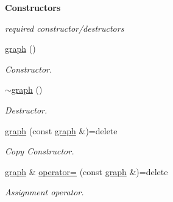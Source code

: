\begin{Indent}{\bf Constructors}\par
{\em required constructor/destructors }\begin{DoxyCompactItemize}
\item 
\hypertarget{classmystl_1_1graph_a3bd4b577259268bb5ddc09953d5bbdd4}{\hyperlink{classmystl_1_1graph_a3bd4b577259268bb5ddc09953d5bbdd4}{graph} ()}\label{classmystl_1_1graph_a3bd4b577259268bb5ddc09953d5bbdd4}

\begin{DoxyCompactList}\small\item\em Constructor. \end{DoxyCompactList}\item 
\hypertarget{classmystl_1_1graph_a18df46cc1311ba1999f0ce3cdf1ab21c}{\hyperlink{classmystl_1_1graph_a18df46cc1311ba1999f0ce3cdf1ab21c}{$\sim$graph} ()}\label{classmystl_1_1graph_a18df46cc1311ba1999f0ce3cdf1ab21c}

\begin{DoxyCompactList}\small\item\em Destructor. \end{DoxyCompactList}\item 
\hypertarget{classmystl_1_1graph_aaaec7844368eb2450398bd41c313a464}{\hyperlink{classmystl_1_1graph_aaaec7844368eb2450398bd41c313a464}{graph} (const \hyperlink{classmystl_1_1graph}{graph} \&)=delete}\label{classmystl_1_1graph_aaaec7844368eb2450398bd41c313a464}

\begin{DoxyCompactList}\small\item\em Copy Constructor. \end{DoxyCompactList}\item 
\hypertarget{classmystl_1_1graph_a331b19cbe43fab284d3329962dc2d15b}{\hyperlink{classmystl_1_1graph}{graph} \& \hyperlink{classmystl_1_1graph_a331b19cbe43fab284d3329962dc2d15b}{operator=} (const \hyperlink{classmystl_1_1graph}{graph} \&)=delete}\label{classmystl_1_1graph_a331b19cbe43fab284d3329962dc2d15b}

\begin{DoxyCompactList}\small\item\em Assignment operator. \end{DoxyCompactList}\end{DoxyCompactItemize}
\end{Indent}
